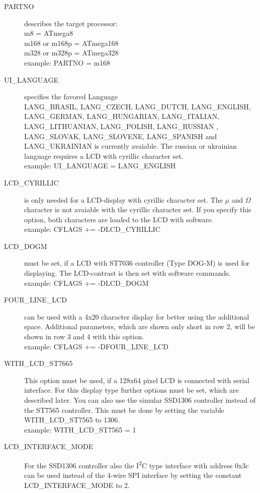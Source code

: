 \begin{description}
  \item[PARTNO] describes the target processor:\\
         m8 = ATmega8\\
         m168 or m168p = ATmega168\\
         m328 or m328p = ATmega328\\
    example:  PARTNO = m168
   \item[UI\_LANGUAGE] specifies the favored Language\\
    LANG\_BRASIL, LANG\_CZECH, LANG\_DUTCH, LANG\_ENGLISH, LANG\_GERMAN, LANG\_HUNGARIAN, LANG\_ITALIAN,
    LANG\_LITHUANIAN, LANG\_POLISH, LANG\_RUSSIAN , LANG\_SLOVAK, LANG\_SLOVENE, LANG\_SPANISH  and LANG\_UKRAINIAN
    is currently avaiable.
 The russian or ukrainian language requires a LCD with cyrillic character set.\\
    example:  UI\_LANGUAGE = LANG\_ENGLISH
  \item[LCD\_CYRILLIC] is only needed for a LCD-display with cyrillic character set. The \(\mu\) and \(\Omega\) character
is not avaiable with the cyrillic character set.
If you specify this option, both characters are loaded to the LCD with software.\\
example: CFLAGS += -DLCD\_CYRILLIC
 \item[LCD\_DOGM] must be set, if a LCD with ST7036 controller (Type DOG-M) is used for displaying.
The LCD-contrast is then set with software commands.\\
example: CFLAGS += -DLCD\_DOGM
 \item[FOUR\_LINE\_LCD] can be used with a 4x20 character display for better using the additional space.
Additional parameters, which are shown only short in row 2, will be shown in row 3 and 4 with this option.\\
example: CFLAGS += -DFOUR\_LINE\_LCD
  \item[WITH\_LCD\_ST7665] This option must be used, if a 128x64 pixel LCD is connected with serial
interface. For this display type further options must be set, which are described later.
You can also use the simular SSD1306 controller instead of the ST7565 controller.
This must be done by setting the variable WITH\_LCD\_ST7565 to 1306.\\
example: WITH\_LCD\_ST7565 = 1 
 \item[LCD\_INTERFACE\_MODE] For the SSD1306 controller also the I\textsuperscript{2}C type interface with address 0x3c
can be used  instead of the 4-wire SPI interface by setting the constant LCD\_INTERFACE\_MODE to 2.\\

\end{description}
